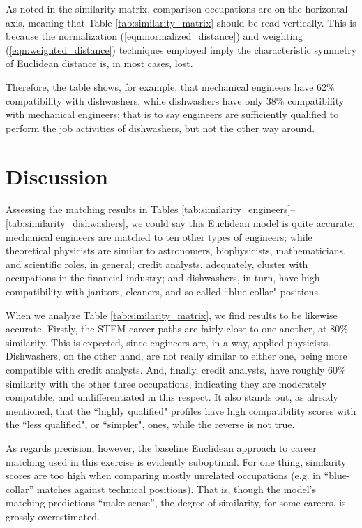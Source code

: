 \documentclass{article}
\begin{document}
As noted in the similarity matrix, comparison occupations are on the horizontal
axis, meaning that Table \ref{tab:similarity_matrix} should be read vertically.
This is because the normalization (\ref{eqn:normalized_distance}) and weighting
(\ref{eqn:weighted_distance}) techniques employed imply the characteristic
symmetry of Euclidean distance is, in most cases, lost.

Therefore, the table shows, for example, that mechanical engineers have 62\%
compatibility with dishwashers, while dishwashers have only 38\% compatibility
with mechanical engineers; that is to say engineers are sufficiently qualified
to perform the job activities of dishwashers, but not the other way around.

\section{Discussion}
Assessing the matching results in Tables
\ref{tab:similarity_engineers}--\ref{tab:similarity_dishwashers}, we could say
this Euclidean model is quite accurate: mechanical engineers are matched to ten
other types of engineers; while theoretical physicists are similar to
astronomers, biophysicists, mathematicians, and scientific roles, in general;
credit analysts, adequately, cluster with occupations in the financial
industry; and dishwashers, in turn, have high compatibility with janitors,
cleaners, and so-called ``blue-collar" positions.

When we analyze Table \ref{tab:similarity_matrix}, we find results to be
likewise accurate. Firstly, the STEM career paths are fairly close to one
another, at 80\% similarity. This is expected, since engineers are, in a way,
applied physicists. Dishwashers, on the other hand, are not really similar to
either one, being more compatible with credit analysts. And, finally, credit
analysts, have roughly 60\% similarity with the other three occupations,
indicating they are moderately compatible, and undifferentiated in this
respect. It also stands out, as already mentioned, that the ``highly qualified"
profiles have high compatibility scores with the ``less qualified", or
``simpler", ones, while the reverse is not true.

As regards precision, however, the baseline Euclidean approach to career
matching used in this exercise is evidently suboptimal. For one thing,
similarity scores are too high when comparing mostly unrelated occupations
(e.g. in ``blue-collar'' matches against technical positions). That is, though
the model's matching predictions ``make sense'', the degree of similarity, for
some careers, is grossly overestimated.
\end{document}
